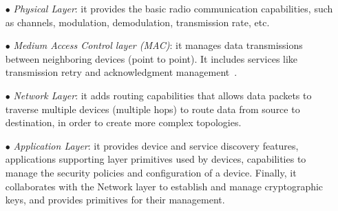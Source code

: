 \documentclass[12pt]{report}
\begin{document}
{{\begin{itemize}
\setlength{\itemindent}{+4mm}
\item[$\bullet$] \emph{Physical Layer}: it provides the basic radio communication capabilities, such as channels, modulation, demodulation, transmission rate, etc.
\item[$\bullet$] \emph{Medium Access Control layer (MAC)}: it manages data transmissions between neighboring devices (point to point). 
It includes services like transmission retry and acknowledgment management~\cite{digi}.
\item[$\bullet$] \emph{Network Layer}: it adds routing capabilities that allows data packets to traverse multiple devices (multiple hops) to route data from source to destination, in order to create more complex topologies.
\item[$\bullet$] \emph{Application Layer}: it provides device and service discovery features, applications supporting layer primitives used by devices, capabilities to manage the security policies and configuration of a device. Finally, it collaborates with the Network layer to establish and manage cryptographic keys, and provides primitives for their management.

\end{itemize}

}}
\end{document}
